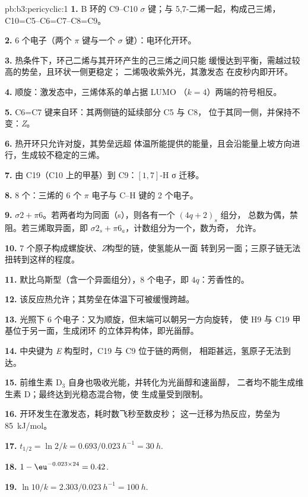 \begin{solution}{pb:b3:pericyclic:1}
\textbf{1.} B 环的 C9--C10 $\sigma$ 键；与 5,7-二烯一起，构成己三烯，
C10=C5--C6=C7--C8=C9。

\textbf{2.} 6 个电子（两个 $\pi$ 键与一个 $\sigma$ 键）：电环化开环。

\textbf{3.} 热条件下，环己二烯与其开环产生的己三烯之间只能
缓慢达到平衡，需越过较高的势垒，且环状一侧更稳定；
二烯吸收紫外光，其激发态
在皮秒内即开环。

\textbf{4.} 顺旋：激发态中，三烯体系的单占据 LUMO
（$k = 4$）两端的符号相反。

\textbf{5.} C6=C7 键来自环：其两侧链的延续部分 C5 与 C8，
位于其同一侧，并保持不变：\textit{Z}。

\textbf{6.} 热开环只允许对旋，其势垒远超
体温所能提供的能量，且会沿能量上坡方向进行，生成较不稳定的三烯。

\textbf{7.} 由 C19（C10 上的甲基）到 C9：$[1,7]$-H σ 迁移。

\textbf{8.} 8 个：三烯的 6 个 $\pi$ 电子与 C--H 键的 2 个电子。

\textbf{9.} $\sigma2 + \pi6$。若两者均为同面（s），则各有一个 $(4q + 2)_s$ 组分，
总数为偶，禁阻。若三烯取异面，即 $\sigma2_s + \pi6_a$，计数组分为一个，数为奇，
允许。

\textbf{10.} 7 个原子构成螺旋状、\textit{Z}构型的链，使氢能从一面
转到另一面；三原子链无法扭转到这样的程度。

\textbf{11.} 默比乌斯型（含一个异面组分），8 个电子，即 $4q$：芳香性的。

\textbf{12.} 该反应热允许；其势垒在体温下可被缓慢跨越。

\textbf{13.} 光照下 6 个电子：又为顺旋，但末端可以朝另一方向旋转，
使 H9 与 C19 甲基位于另一面，生成闭环
的立体异构体，即光甾醇。

\textbf{14.} 中央键为 \textit{E} 构型时，C19 与 C9 位于链的两侧，
相距甚远，氢原子无法到达。

\textbf{15.} 前维生素 D$_3$ 自身也吸收光能，并转化为光甾醇和速甾醇，
二者均不能生成维生素 D；最终达到光稳态混合物，使
生成量受到限制。

\textbf{16.} 开环发生在激发态，耗时数飞秒至数皮秒；
这一迁移为热反应，势垒为 \qty{85}{kJ/mol}。

\textbf{17.} $t_{1/2} = \ln 2/k = 0.693/\qty{0.023}{h^{-1}} = \qty{30}{h}$.

\textbf{18.} $1 - \eu^{-0.023 \times 24} = 0.42$.

\textbf{19.} $\ln 10/k = 2.303/\qty{0.023}{h^{-1}} = \qty{100}{h}$.


\end{solution}
